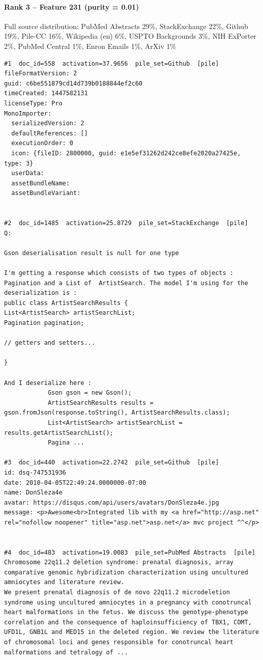 \paragraph*{Rank 3 -- Feature 231 (purity = 0.01)}

Full source distribution: PubMed Abstracts 29\%, StackExchange 22\%, Github 19\%, Pile-CC 16\%, Wikipedia (en) 6\%, USPTO Backgrounds 3\%, NIH ExPorter 2\%, PubMed Central 1\%, Enron Emails 1\%, ArXiv 1\%

\begin{verbatim}
#1  doc_id=558  activation=37.9656  pile_set=Github  [pile]
fileFormatVersion: 2
guid: c6be551879cd14d739b0188844ef2c60
timeCreated: 1447582131
licenseType: Pro
MonoImporter:
  serializedVersion: 2
  defaultReferences: []
  executionOrder: 0
  icon: {fileID: 2800000, guid: e1e5ef31262d242ce8efe2020a27425e, type: 3}
  userData: 
  assetBundleName: 
  assetBundleVariant: 


#2  doc_id=1485  activation=25.8729  pile_set=StackExchange  [pile]
Q:

Gson deserialisation result is null for one type

I'm getting a response which consists of two types of objects : Pagination and a List of  ArtistSearch. The model I'm using for the deserialization is : 
public class ArtistSearchResults {
List<ArtistSearch> artistSearchList;
Pagination pagination;

// getters and setters...

}

And I deserialize here : 
            Gson gson = new Gson();
            ArtistSearchResults results = gson.fromJson(response.toString(), ArtistSearchResults.class);
            List<ArtistSearch> artistSearchList = results.getArtistSearchList();
            Pagina ...

#3  doc_id=440  activation=22.2742  pile_set=Github  [pile]
id: dsq-747531936
date: 2010-04-05T22:49:24.0000000-07:00
name: DonSleza4e
avatar: https://disqus.com/api/users/avatars/DonSleza4e.jpg
message: <p>Awesome<br>Integrated lib with my <a href="http://asp.net" rel="nofollow noopener" title="asp.net">asp.net</a> mvc project ^^</p>


#4  doc_id=483  activation=19.0083  pile_set=PubMed Abstracts  [pile]
Chromosome 22q11.2 deletion syndrome: prenatal diagnosis, array comparative genomic hybridization characterization using uncultured amniocytes and literature review.
We present prenatal diagnosis of de novo 22q11.2 microdeletion syndrome using uncultured amniocytes in a pregnancy with conotruncal heart malformations in the fetus. We discuss the genotype-phenotype correlation and the consequence of haploinsufficiency of TBX1, COMT, UFD1L, GNB1L and MED15 in the deleted region. We review the literature of chromosomal loci and genes responsible for conotruncal heart malformations and tetralogy of ...


\end{verbatim}
